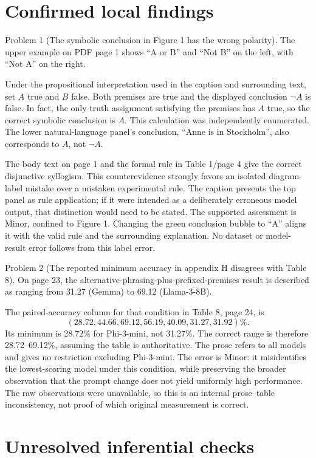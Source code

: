 \documentclass[10pt]{article}
\begin{document}
\section*{Confirmed local findings}
Problem 1 (The symbolic conclusion in Figure 1 has the wrong polarity).  The upper example on PDF page 1 shows “A or B” and “Not B” on the left, with “Not A” on the right.\par
Under the propositional interpretation used in the caption and surrounding text, set \(A\) true and \(B\) false. Both premises are true and the displayed conclusion \(\neg A\) is false. In fact, the only truth assignment satisfying the premises has \(A\) true, so the correct symbolic conclusion is \(A\). This calculation was independently enumerated. The lower natural-language panel’s conclusion, “Anne is in Stockholm”, also corresponds to \(A\), not \(\neg A\).\par
The body text on page 1 and the formal rule in Table 1/page 4 give the correct disjunctive syllogism. This counterevidence strongly favors an isolated diagram-label mistake over a mistaken experimental rule. The caption presents the top panel as rule application; if it were intended as a deliberately erroneous model output, that distinction would need to be stated. The supported assessment is Minor, confined to Figure 1. Changing the green conclusion bubble to “A” aligns it with the valid rule and the surrounding explanation. No dataset or model-result error follows from this label error.\par
Problem 2 (The reported minimum accuracy in appendix H disagrees with Table 8).  On page 23, the alternative-phrasing-plus-prefixed-premises result is described as ranging from 31.27 (Gemma) to 69.12 (Llama-3-8B).\par
The paired-accuracy column for that condition in Table 8, page 24, is \[(28.72,44.66,69.12,56.19,40.09,31.27,31.92)\%.\] Its minimum is 28.72\% for Phi-3-mini, not 31.27\%. The correct range is therefore 28.72–69.12\%, assuming the table is authoritative. The prose refers to all models and gives no restriction excluding Phi-3-mini. The error is Minor: it misidentifies the lowest-scoring model under this condition, while preserving the broader observation that the prompt change does not yield uniformly high performance. The raw observations were unavailable, so this is an internal prose–table inconsistency, not proof of which original measurement is correct.\par
\section*{Unresolved inferential checks}
\end{document}
